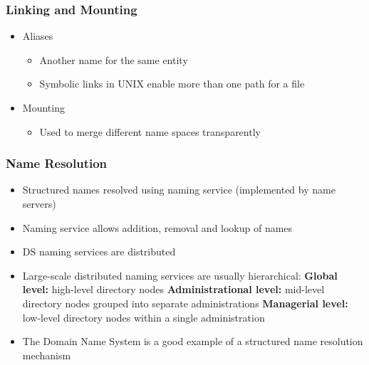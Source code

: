 \subsubsection{Linking and Mounting}
\begin{itemize}
	\item Aliases
	\begin{itemize}
		\item Another name for the same entity
		\item Symbolic links in UNIX enable more than one path for a file
	\end{itemize}
	\item Mounting
	\begin{itemize}
		\item Used to merge different name spaces transparently
	\end{itemize}	
\end{itemize}

\subsubsection{Name Resolution}
\begin{itemize}
	\item Structured names resolved using naming service (implemented by name servers)
	\item Naming service allows addition, removal and lookup of names
	\item DS naming services are distributed
	\item Large-scale distributed naming services are usually hierarchical:
	\subitem\textbf{Global level:} high-level directory nodes
	\subitem\textbf{Administrational level:} mid-level directory nodes grouped into separate administrations
	\subitem\textbf{Managerial level:} low-level directory nodes within a single administration
	\item The Domain Name System is a good example of a structured name resolution mechanism
\end{itemize}

